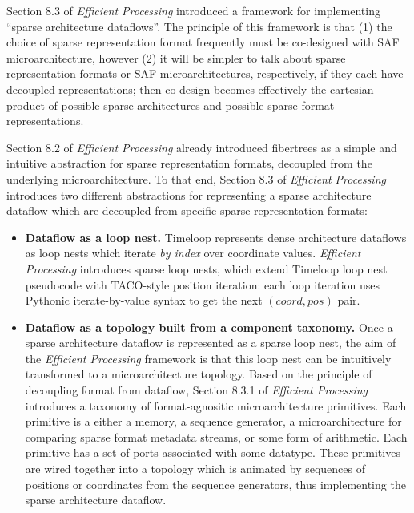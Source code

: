 Section 8.3 of \textit{Efficient Processing} introduced a framework for implementing ``sparse architecture dataflows''. The principle of this framework is that (1) the choice of sparse representation format frequently must be co-designed with SAF microarchitecture, however (2) it will be simpler to talk about sparse representation formats or SAF microarchitectures, respectively, if they each have decoupled representations; then co-design becomes effectively the cartesian product of possible sparse architectures and possible sparse format representations. 

Section 8.2 of \textit{Efficient Processing} already introduced fibertrees as a simple and intuitive abstraction for sparse representation formats, decoupled from the underlying microarchitecture. To that end, Section 8.3 of \textit{Efficient Processing} introduces two different abstractions for representing a sparse architecture dataflow which are decoupled from specific sparse representation formats:

\begin{itemize}
    \item \textbf{Dataflow as a loop nest.} Timeloop\cite{timeloop} represents dense architecture dataflows as loop nests which iterate \textit{by index} over coordinate values. \textit{Efficient Processing} introduces sparse loop nests, which extend Timeloop loop nest pseudocode with TACO\cite{taco_format}-style position iteration: each loop iteration uses Pythonic iterate-by-value syntax to get the next $(coord,pos)$ pair.
    \item \textbf{Dataflow as a topology built from a component taxonomy.} Once a sparse architecture dataflow is represented as a sparse loop nest, the aim of the \textit{Efficient Processing} framework is that this loop nest can be intuitively transformed to a microarchitecture topology. Based on the principle of decoupling format from dataflow, Section 8.3.1 of \textit{Efficient Processing} introduces a taxonomy of format-agnositic microarchitecture primitives. Each primitive is a either a memory, a sequence generator, a microarchitecture for comparing sparse format metadata streams, or some form of arithmetic. Each primitive has a set of ports associated with some datatype. These primitives are wired together into a topology which is animated by sequences of positions or coordinates from the sequence generators, thus implementing the sparse architecture dataflow.
\end{itemize}

